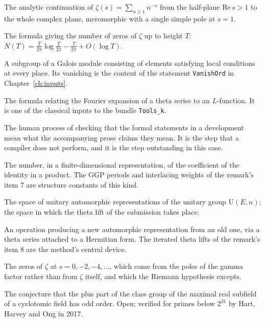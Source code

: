 \begin{description}[style=nextline,leftmargin=0pt,labelwidth=0pt,labelsep=0pt,font=\sffamily\bfseries\small,
  itemsep=5pt]
\item[Riemann zeta function] The analytic continuation of
$\zeta(s) = \sum_{n \ge 1} n^{-s}$ from the half-plane $\mathrm{Re}\,  s > 1$ to the
whole complex plane, meromorphic with a single simple pole at $s = 1$.

\item[Riemann--von Mangoldt formula] The formula giving the number of zeros of
$\zeta$ up to height $T$:
$N(T) = \frac{T}{2\pi}\log\frac{T}{2\pi} - \frac{T}{2\pi} + O(\log T)$.

\item[Selmer group] A subgroup of a Galois module consisting of elements
satisfying local conditions at every place. Its vanishing is the content of
the statement \texttt{VanishOrd} in Chapter~\ref{ch:inputs}.

\item[Siegel--Weil formula] The formula relating the Fourier expansion of a
theta series to an $L$-function. It is one of the classical inputs to the
bundle \texttt{Tools\_k}.

\item[Statement review] The human process of checking that the formal
statements in a development mean what the accompanying prose claims they
mean. It is the step that a compiler does not perform, and it is the step
outstanding in this case.

\item[Structure constant] The number, in a finite-dimensional representation,
of the coefficient of the identity in a product. The GGP periods and
interlacing weights of the remark's item 7 are structure constants of this
kind.

\item[Submodule $\mathbb{C}^{\mathrm{UA}(E,n)}$] The space of unitary
automorphic representations of the unitary group $\mathrm{U}(E,n)$; the space
in which the theta lift of the submission takes place.

\item[Theta lift] An operation producing a new automorphic representation from
an old one, via a theta series attached to a Hermitian form. The iterated
theta lifts of the remark's item 8 are the method's central device.

\item[Trivial zeros] The zeros of $\zeta$ at $s = 0, -2, -4, \dots$, which
come from the poles of the gamma factor rather than from $\zeta$ itself, and
which the Riemann hypothesis excepts.

\item[Vandiver's conjecture] The conjecture that the plus part of the class
group of the maximal real subfield of a cyclotomic field has odd order. Open;
verified for primes below $2^{31}$ by Hart, Harvey and Ong in 2017.


\end{description}
